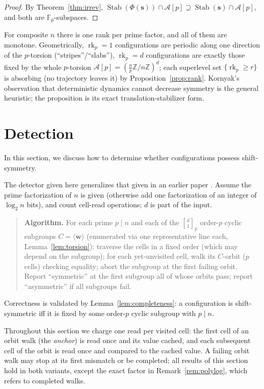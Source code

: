 \documentclass[11pt,a4paper]{article}
\theoremstyle{remark}
\DeclareMathOperator{\Stab}{Stab}
\DeclareMathOperator{\rk}{rk}
\newcommand{\ZZ}{\mathbb{Z}}
\newcommand{\FF}{\mathbb{F}}
\newcommand{\A}{\mathcal{A}}
\newcommand{\ww}{\mathbf{w}}
\newcommand{\ssb}{\mathbf{s}}
\newcommand{\gaussbinom}[2]{\genfrac{[}{]}{0pt}{}{#1}{#2}}
\begin{document}
\begin{proof}
By Theorem~\ref{thm:irrev}, $\Stab(\Phi(\ssb))\cap\A[p]\supseteq
\Stab(\ssb)\cap\A[p]$, and both are $\FF_p$-subspaces.
\end{proof}

For composite $n$ there is one rank per prime factor, and all of them are
monotone. Geometrically, $\rk_p=1$ configurations are
periodic along one direction of the $p$-torsion (``stripes''/``slabs''),
$\rk_p=d$ configurations are exactly those fixed by the whole $p$-torsion
$\A[p]=(\tfrac np\ZZ/n\ZZ)^d$; each superlevel set $\{\rk_p\ge r\}$ is
absorbing (no trajectory leaves it) by Proposition~\ref{prop:rank}. Kornyak's
observation that deterministic dynamics cannot decrease symmetry
\cite{kornyak2010} is the general heuristic; the proposition is its exact
translation-stabilizer form.

\section{Detection}\label{sec:detection}

In this section, we discuss how to determine whether configurations possess shift-symmetry.

The detector given here generalizes that given in an earlier paper \cite[Sec.~V]{banda2019}. Assume the prime
factorization of $n$ is given (otherwise add one factorization of an
integer of $\log_2 n$ bits), and count cell-read operations; $d$ is part
of the input.

\begin{quote}
\textbf{Algorithm.} For each prime $p\mid n$ and each of the
$\gaussbinom d1_p$ order-$p$ cyclic subgroups $C=\langle\ww\rangle$
(enumerated via one representative line each,
Lemma~\ref{lem:torsion}): traverse the cells in a fixed order (which may depend on the subgroup); for each
yet-unvisited cell, walk its $C$-orbit ($p$ cells) checking equality;
abort the subgroup at the first failing orbit. Report ``symmetric'' at
the first subgroup all of whose orbits pass; report ``asymmetric'' if all
subgroups fail.
\end{quote}

Correctness is validated by Lemma~\ref{lem:completeness}: a configuration is
shift-symmetric iff it is fixed by some order-$p$ cyclic subgroup with
$p\mid n$.

Throughout this section we charge one read per visited cell: the first
cell of an orbit walk (the \emph{anchor}) is read once and its value
cached, and each subsequent cell of the orbit is read once and compared
to the cached value. A failing orbit walk may stop at its first mismatch or be completed; all
results of this section hold in both variants, except the exact factor in
Remark~\ref{rem:polylog}, which refers to completed walks.
\end{document}
